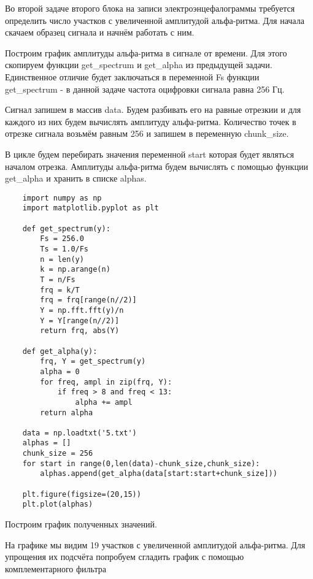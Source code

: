 \solutionSection

Во второй задаче второго блока на записи электроэнцефалограммы требуется определить число участков с увеличенной амплитудой альфа-ритма. Для начала скачаем образец сигнала и начнём работать с ним.

Построим график амплитуды альфа-ритма в сигнале от времени. Для этого скопируем функции get\_spectrum и get\_alpha из предыдущей задачи. Единственное отличие будет заключаться в переменной Fs функции get\_spectrum - в данной задаче частота оцифровки сигнала равна 256 Гц.

Сигнал запишем в массив data. Будем разбивать его на равные отрезкии и для каждого из них будем вычислять амплитуду альфа-ритма. Количество точек в отрезке сигнала возьмём равным 256 и запишем в переменную chunk\_size.

В цикле будем перебирать значения переменной start которая будет являться началом отрезка. Амплитуды альфа-ритма будем вычислять с помощью функции get\_alpha и хранить в списке alphas.

\begin{verbatim}
    import numpy as np
    import matplotlib.pyplot as plt

    def get_spectrum(y):
        Fs = 256.0
        Ts = 1.0/Fs
        n = len(y)
        k = np.arange(n)
        T = n/Fs
        frq = k/T
        frq = frq[range(n//2)]
        Y = np.fft.fft(y)/n
        Y = Y[range(n//2)]
        return frq, abs(Y)

    def get_alpha(y):
        frq, Y = get_spectrum(y)
        alpha = 0
        for freq, ampl in zip(frq, Y):
            if freq > 8 and freq < 13:
                alpha += ampl
        return alpha

    data = np.loadtxt('5.txt')
    alphas = []
    chunk_size = 256
    for start in range(0,len(data)-chunk_size,chunk_size):
        alphas.append(get_alpha(data[start:start+chunk_size]))

    plt.figure(figsize=(20,15))
    plt.plot(alphas)
\end{verbatim}

Построим график полученных значений.


На графике мы видим 19 участков с увеличенной амплитудой альфа-ритма. Для упрощения их подсчёта попробуем сгладить график с помощью комплементарного фильтра

